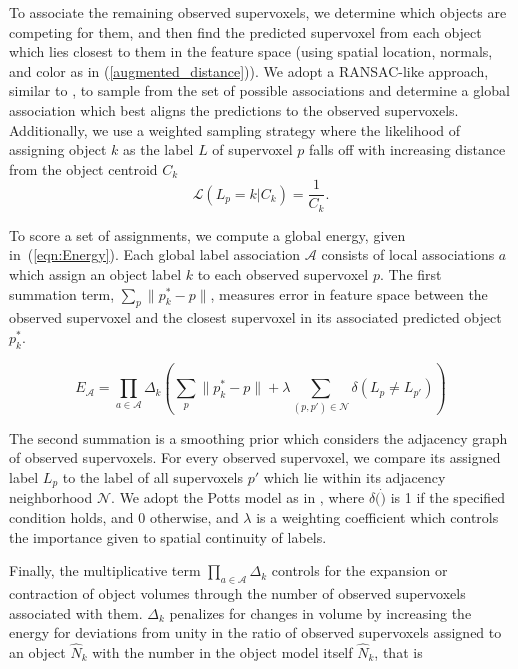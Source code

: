 To associate the remaining observed supervoxels, we determine which objects are competing for them, and then find the predicted supervoxel from each object which lies closest to them in the feature space (using spatial location, normals, and color as in (\ref{augmented_distance})). We adopt a RANSAC-like approach, similar to \cite{EnergyBasedMultiModel}, to sample from the set of possible associations and determine a global association which best aligns the predictions to the observed supervoxels. Additionally, we use a weighted sampling strategy where the likelihood of assigning object $k$ as the label $L$ of supervoxel $p$ falls off with increasing distance from the object centroid $C_k$
\begin{equation}
 \label{eqn:WeightSampling}
 \mathcal{L}(L_p=k | C_k) = \frac{1}{C_k}.
\end{equation}

To score a set of assignments, we compute a global energy, given in~(\ref{eqn:Energy}). Each global label association $\mathcal{A}$ consists of local associations $a$ which assign an object label $k$ to each observed supervoxel $p$. The first summation term, $ \sum_{p}{\|p^*_k - p\|} $, measures error in feature space between the observed supervoxel and the closest supervoxel in its associated predicted object $p^*_k$. 

\begin{equation}
\label{eqn:Energy}
{E}_\mathcal{A} =\prod_{a\in\mathcal{A}}{\Delta_k} \left( \sum_{p}{\|p^*_k - p\|} + \lambda \sum_{(p,p')\in \mathcal{N} }\delta(L_p \not= L_{p'}) \right) 
\end{equation}

The second summation is a smoothing prior which considers the adjacency graph of observed supervoxels. For every observed supervoxel, we compare its assigned label $L_p$ to the label of all supervoxels $p'$ which lie within its adjacency neighborhood $\mathcal{N}$. We adopt the Potts model as in \cite{Boykov2001}, where $\delta(\dot)$ is 1 if the specified condition holds, and 0 otherwise, and $\lambda$ is a weighting coefficient which controls the importance given to spatial continuity of labels.

Finally, the multiplicative term $\prod_{a\in\mathcal{A}}{\Delta_k}$ controls for the expansion or contraction of object volumes through the number of observed supervoxels associated with them. $\Delta_k$ penalizes for changes in volume by increasing the energy for deviations from unity in the ratio of observed supervoxels assigned to an object $\hat{N}_k$ with the number in the object model itself $\hat{N}_k$, that is

